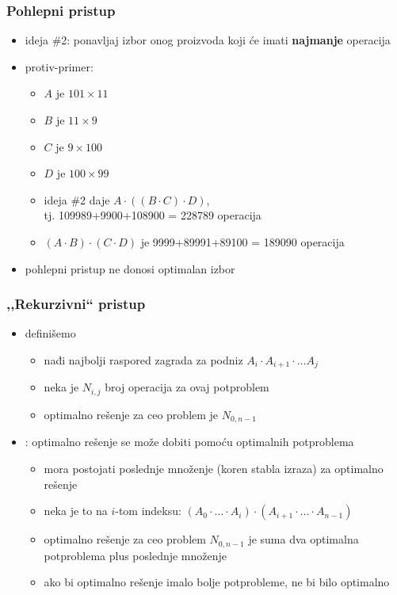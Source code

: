 \documentclass[compress,aspectratio=169]{beamer}
\begin{document}
\begin{frame}[fragile]
  \frametitle{Pohlepni pristup}
  \begin{itemize}
    \item ideja \#2: ponavljaj izbor onog proizvoda koji će imati \textbf{najmanje} operacija
    \item protiv-primer:
    \begin{itemize}
      \item $A$ je $101\times 11$
      \item $B$ je $11\times 9$
      \item $C$ je $9\times 100$
      \item $D$ je $100\times 99$
      \item ideja \#2 daje $A\cdot ((B\cdot C)\cdot D)$, \\ tj. 109989+9900+108900 = 228789 operacija
      \item $(A\cdot B)\cdot (C\cdot D)$ je 9999+89991+89100 = 189090 operacija
    \end{itemize}
    \item pohlepni pristup ne donosi optimalan izbor
  \end{itemize}
\end{frame}

\begin{frame}[fragile]
  \frametitle{,,Rekurzivni`` pristup}
  \begin{itemize}
    \item definišemo 
    \begin{itemize}
      \item nađi najbolji raspored zagrada za podniz $A_{i}\cdot A_{i+1}\cdot \ldots A_{j}$
      \item neka je $N_{i,j}$ broj operacija za ovaj potproblem
      \item optimalno rešenje za ceo problem je $N_{0,n-1}$
    \end{itemize}
    \item {}: optimalno rešenje se može 
    dobiti pomoću optimalnih potproblema
    \begin{itemize}
      \item mora postojati poslednje množenje (koren stabla izraza) za 
      optimalno rešenje
      \item neka je to na $i$-tom indeksu: $(A_{0}\cdot \ldots \cdot A_{i})\cdot (A_{i+1}\cdot \ldots \cdot A_{n-1})$
      \item optimalno rešenje za ceo problem $N_{0,n-1}$ je suma dva optimalna potproblema plus poslednje množenje
      \item ako bi optimalno rešenje imalo bolje potprobleme, ne bi bilo optimalno
    \end{itemize}
  \end{itemize}
\end{frame}
\end{document}
